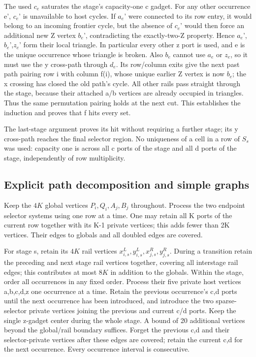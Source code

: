 \documentclass[11pt]{article}
\begin{document}
The used $c_e$ saturates the stage's capacity-one c gadget. For any other occurrence e', $c_e$' is unavailable to host cycles. If $a_e$' were connected to its row entry, it would belong to an incoming frontier cycle, but the absence of $c_e$' would then force an additional new Z vertex $b_e$', contradicting the exactly-two-Z property. Hence $a_e$',$b_e$',$z_e$' form their local triangle. In particular every other z port is used, and e is the unique occurrence whose triangle is broken. Also $b_e$ cannot use $a_e$ or $z_e$, so it must use the y cross-path through $d_e$. Its row/column exits give the next past path pairing row i with column f(i), whose unique earlier Z vertex is now $b_e$; the x crossing has closed the old path's cycle. All other rails pass straight through the stage, because their attached a/b vertices are already occupied in triangles. Thus the same permutation pairing holds at the next cut. This establishes the induction and proves that f hits every set.

The last-stage argument proves its hit without requiring a further stage; its y cross-path reaches the final selector region. No uniqueness of a cell in a row of $S_s$ was used: capacity one is across all c ports of the stage and all d ports of the stage, independently of row multiplicity.

\subsection{Explicit path decomposition and simple graphs}

Keep the  $4K$ global vertices $P_i,Q_i,A_j,B_j$ throughout. Process the two endpoint selector systems using one row at a time. One may retain all K ports of the current row together with its K-1 private vertices; this adds fewer than 2K vertices. Their edges to globals and all doubled edges are covered.

For stage s, retain its $4K$ rail vertices $x^L_{i,s},y^L_{i,s},x^R_{j,s},y^R_{j,s}$. During a transition retain the preceding and next stage rail vertices together, covering all interstage rail edges; this contributes at most $8K$ in addition to the globals. Within the stage, order all occurrences in any fixed order. Process their five private host vertices a,b,c,d,z one occurrence at a time. Retain the previous occurrence's c,d ports until the next occurrence has been introduced, and introduce the two sparse-selector private vertices joining the previous and current c/d ports. Keep the single z-gadget center during the whole stage. A bound of 20 additional vertices beyond the global/rail boundary suffices. Forget the previous c,d and their selector-private vertices after these edges are covered; retain the current c,d for the next occurrence. Every occurrence interval is consecutive.
\end{document}
